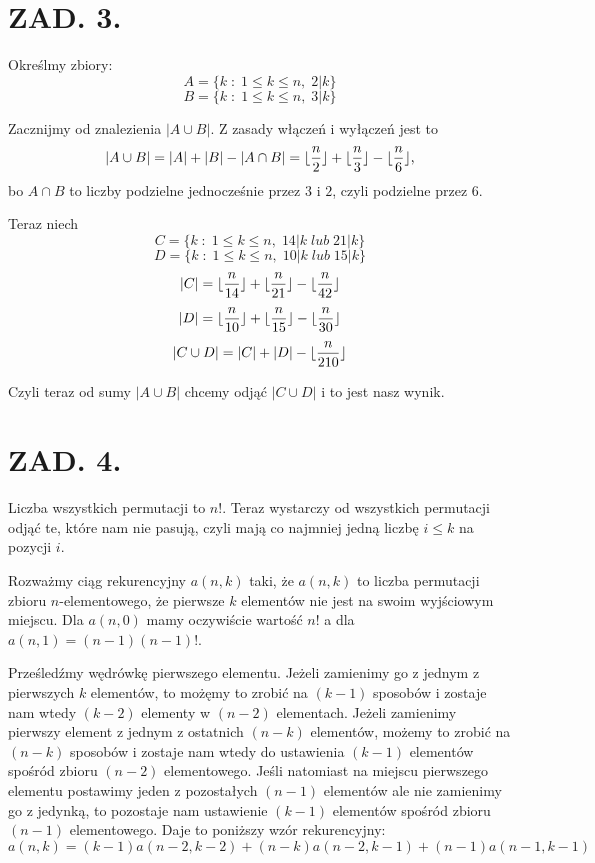 \documentclass{article}[13pt]
\begin{document}
\section*{ZAD. 3.}

Określmy zbiory:
$$A=\{k\;:\;1\leq k\leq n,\; 2 | k\}$$
$$B=\{k\;:\;1\leq k\leq n,\; 3 | k\}$$

Zacznijmy od znalezienia $|A\cup B|$. Z zasady włączeń i wyłączeń jest to
$$|A\cup B|=|A|+|B|-|A\cap B|=\lfloor{n\over 2}\rfloor+\lfloor{n\over 3}\rfloor-\lfloor{n\over 6}\rfloor,$$
bo $A\cap B$ to liczby podzielne jednocześnie przez $3$ i $2$, czyli podzielne przez $6$.
\medskip

Teraz niech
$$C=\{k\;:\;1\leq k\leq n,\; 14 | k\;lub\;21 | k\}$$
$$D=\{k\;:\;1\leq k\leq n,\; 10 | k\;lub\;15 | k\}$$
$$|C|=\lfloor{n\over 14}\rfloor+\lfloor{n\over 21}\rfloor -\lfloor{n\over 42}\rfloor$$
$$|D|=\lfloor{n\over 10}\rfloor+\lfloor{n\over15}\rfloor-\lfloor{n\over 30}\rfloor$$
$$|C\cup D|=|C|+|D|-\lfloor{n\over 210}\rfloor$$

Czyli teraz od sumy $|A\cup B|$ chcemy odjąć $|C\cup D|$ i to jest nasz wynik.


\section*{ZAD. 4.}

Liczba wszystkich permutacji to $n!$. Teraz wystarczy od wszystkich permutacji odjąć te, które nam nie pasują, czyli mają co najmniej jedną liczbę $i\leq k$ na pozycji $i$.

Rozważmy ciąg rekurencyjny $a(n, k)$ taki, że $a(n, k)$ to liczba permutacji zbioru $n$-elementowego, że pierwsze $k$ elementów nie jest na swoim wyjściowym miejscu. Dla $a(n, 0)$ mamy oczywiście wartość $n!$ a dla $a(n, 1)=(n-1)(n-1)!$.

Prześledźmy wędrówkę pierwszego elementu. Jeżeli zamienimy go z jednym z pierwszych $k$ elementów, to możęmy to zrobić na $(k-1)$ sposobów i zostaje nam wtedy $(k-2)$ elementy w $(n-2)$ elementach. Jeżeli zamienimy pierwszy element z jednym z ostatnich $(n-k)$ elementów, możemy to zrobić na $(n-k)$ sposobów i zostaje nam wtedy do ustawienia $(k-1)$ elementów spośród zbioru $(n-2)$ elementowego. Jeśli natomiast na miejscu pierwszego elementu postawimy jeden z pozostałych $(n-1)$ elementów ale nie zamienimy go z jedynką, to pozostaje nam ustawienie $(k-1)$ elementów spośród zbioru $(n-1)$ elementowego. Daje to poniższy wzór rekurencyjny:
$$a(n, k)=(k-1)a(n-2, k-2)+(n-k)a(n-2, k-1)+(n-1)a(n-1, k-1)$$
\end{document}
